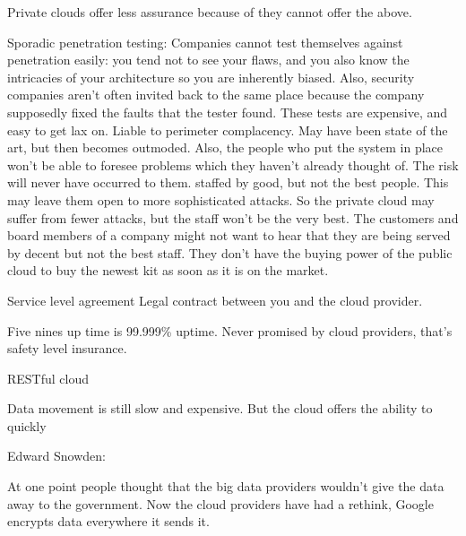 \documentclass[11pt]{article}
\begin{document}
Private clouds offer less assurance because of they cannot offer the above.

Sporadic penetration testing: Companies cannot test themselves against penetration easily: you tend not to see your flaws, and you also know the intricacies of your architecture so you are inherently biased. Also, security companies aren’t often invited back to the same place because the company supposedly fixed the faults that the tester found. These tests are expensive, and easy to get lax on.
Liable to perimeter complacency. May have been state of the art, but then becomes outmoded. Also, the people who put the system in place won’t be able to foresee problems which they haven’t already thought of. The risk will never have occurred to them.
staffed by good, but not the best people. This may leave them open to more sophisticated attacks. So the private cloud may suffer from fewer attacks, but the staff won’t be the very best. The customers and board members of a company might not want to hear that they are being served by decent but not the best staff.
They don’t have the buying power of the public cloud to buy the newest kit as soon as it is on the market.

Service level agreement
Legal contract between you and the cloud provider.

Five nines up time is 99.999\% uptime. Never promised by cloud providers, that’s safety level insurance.

RESTful cloud

Data movement is still slow and expensive. But the cloud offers the ability to quickly 

Edward Snowden:

At one point people thought that the big data providers wouldn’t give the data away to the government. Now the cloud providers have had a rethink, Google encrypts data everywhere it sends it.
\end{document}

